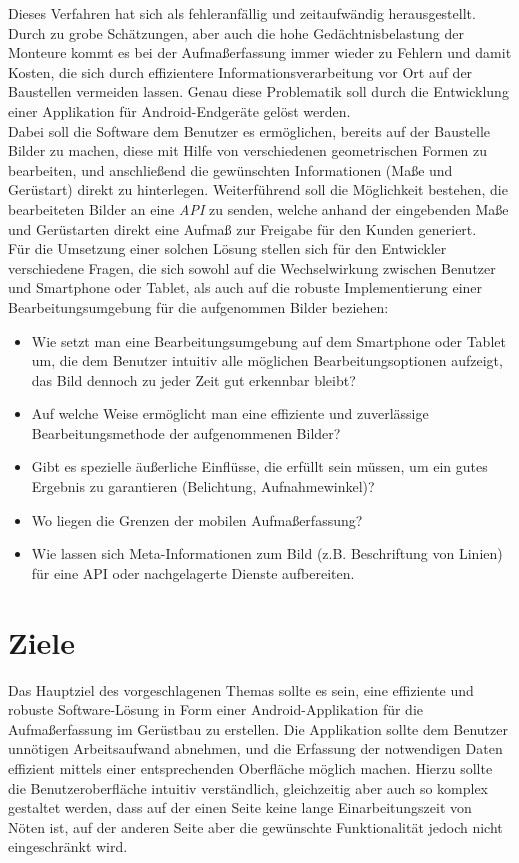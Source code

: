 \documentclass[a4paper]{article}
\begin{document}
Dieses Verfahren hat sich als fehleranfällig und zeitaufwändig herausgestellt.
Durch zu grobe Schätzungen, aber auch die hohe Gedächtnisbelastung der Monteure kommt es bei der Aufmaßerfassung immer wieder zu Fehlern und damit Kosten, die sich durch effizientere Informationsverarbeitung vor Ort auf der Baustellen vermeiden lassen.
Genau diese Problematik soll durch die Entwicklung einer Applikation für Android-Endgeräte gelöst werden. \\

Dabei soll die Software dem Benutzer es ermöglichen, bereits auf der Baustelle Bilder zu machen, diese mit Hilfe von verschiedenen geometrischen Formen zu bearbeiten, und anschließend die gewünschten Informationen (Maße und Gerüstart) direkt zu hinterlegen.
Weiterführend soll die Möglichkeit bestehen, die bearbeiteten Bilder an eine \textit{API} zu senden, welche anhand der eingebenden Maße und Gerüstarten direkt eine Aufmaß zur Freigabe für den Kunden generiert.\\

Für die Umsetzung einer solchen Lösung stellen sich für den Entwickler verschiedene Fragen, die sich sowohl auf die Wechselwirkung zwischen Benutzer und Smartphone oder Tablet, als auch auf die robuste Implementierung einer Bearbeitungsumgebung für die aufgenommen Bilder beziehen: \\

\begin{itemize}
    \item Wie setzt man eine Bearbeitungsumgebung auf dem Smartphone oder Tablet um, die dem Benutzer intuitiv alle möglichen Bearbeitungsoptionen aufzeigt, das Bild dennoch zu jeder Zeit gut erkennbar bleibt?
    \item Auf welche Weise ermöglicht man eine effiziente und zuverlässige Bearbeitungsmethode der aufgenommenen Bilder?
    \item Gibt es spezielle äußerliche Einflüsse, die erfüllt sein müssen, um ein gutes Ergebnis zu garantieren (Belichtung, Aufnahmewinkel)?
    \item Wo liegen die Grenzen der mobilen Aufmaßerfassung?
    \item Wie lassen sich Meta-Informationen zum Bild (z.B. Beschriftung von Linien) für eine API oder nachgelagerte Dienste aufbereiten.
\end{itemize}

\section*{Ziele}
Das Hauptziel des vorgeschlagenen Themas sollte es sein, eine effiziente und robuste Software-Lösung in Form einer Android-Applikation für die Aufmaßerfassung im Gerüstbau zu erstellen. 
Die Applikation sollte dem Benutzer unnötigen Arbeitsaufwand abnehmen, und die Erfassung der notwendigen Daten effizient mittels einer entsprechenden Oberfläche möglich machen.
Hierzu sollte die Benutzeroberfläche intuitiv verständlich, gleichzeitig aber auch so komplex gestaltet werden, dass auf der einen Seite keine lange Einarbeitungszeit von Nöten ist, auf der anderen Seite aber die gewünschte Funktionalität jedoch nicht eingeschränkt wird.
\end{document}
